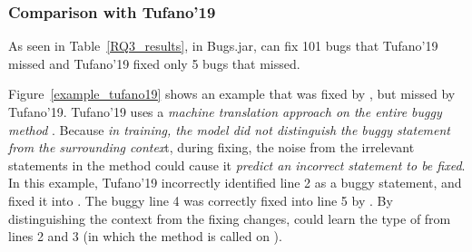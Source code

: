 \subsubsection{\bf Comparison with Tufano'19}





As seen in Table~\ref{RQ3_results}, in Bugs.jar, {\tool} can fix 101
bugs that Tufano'19 missed and Tufano'19 fixed only 5 bugs
that {\tool} missed.

Figure~\ref{example_tufano19} shows an example that was fixed by
{\tool}, but missed by Tufano'19. Tufano'19 uses a {\em
  machine translation approach on the entire buggy method}
.  Because {\em in training, the model did not
  distinguish the buggy statement from the surrounding contex}t,
during fixing, the noise from the irrelevant statements in the method
could cause it {\em predict an incorrect statement to be fixed}. In
this example, Tufano'19 incorrectly identified line 2 as a buggy
statement, and fixed it into  
\code{()} \code{==}   . The buggy
line 4 was correctly fixed into line 5 by {\tool}. By distinguishing
the context from the fixing changes, {\tool} could learn the type
 of  from lines 2 and 3 (in which the
method  is called on ).


